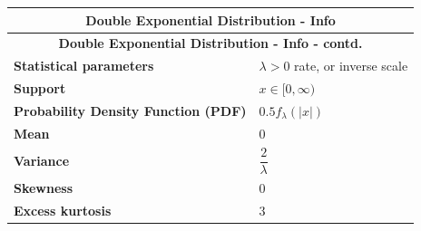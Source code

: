 \renewcommand{\arraystretch}{2}
\begin{longtable}{|m{6cm}|p{9cm}|}
    \hline
    \multicolumn{2}{|c|}{\textbf{Double Exponential Distribution - Info}} \\
    \hline\endfirsthead

    \hline
    \multicolumn{2}{|c|}{\textbf{Double Exponential Distribution - Info - contd.}} \\
    \hline\endhead
    
    \hline\endfoot
    \hline\endlastfoot

    \textbf{Statistical parameters} & 
    ${\displaystyle \lambda >0}$ rate, or inverse scale
    \\ \hline
    
    \textbf{Support} &
    ${\displaystyle x\in [0,\infty )}$
    \\ \hline

    \textbf{Probability Density Function (PDF)} & 
    $0.5f_\lambda(|x|)$
    \\[1ex] \hline
    
    \textbf{Mean} & 
    $0$
    \\[1ex] \hline

    \textbf{Variance} &
    $\dfrac{2}{\lambda}$
    \\[1ex] \hline

    \textbf{Skewness} &
    $0$
    \\ \hline

    \textbf{Excess kurtosis} &
    $3$
    \\ \hline

\end{longtable}
\renewcommand{\arraystretch}{1}























